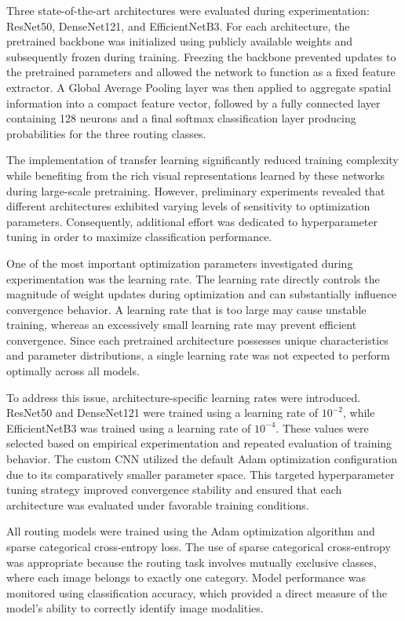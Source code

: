 Three state-of-the-art architectures were evaluated during experimentation: ResNet50, DenseNet121, and EfficientNetB3. For each architecture, the pretrained backbone was initialized using publicly available weights and subsequently frozen during training. Freezing the backbone prevented updates to the pretrained parameters and allowed the network to function as a fixed feature extractor. A Global Average Pooling layer was then applied to aggregate spatial information into a compact feature vector, followed by a fully connected layer containing 128 neurons and a final softmax classification layer producing probabilities for the three routing classes.

The implementation of transfer learning significantly reduced training complexity while benefiting from the rich visual representations learned by these networks during large-scale pretraining. However, preliminary experiments revealed that different architectures exhibited varying levels of sensitivity to optimization parameters. Consequently, additional effort was dedicated to hyperparameter tuning in order to maximize classification performance.

One of the most important optimization parameters investigated during experimentation was the learning rate. The learning rate directly controls the magnitude of weight updates during optimization and can substantially influence convergence behavior. A learning rate that is too large may cause unstable training, whereas an excessively small learning rate may prevent efficient convergence. Since each pretrained architecture possesses unique characteristics and parameter distributions, a single learning rate was not expected to perform optimally across all models.

To address this issue, architecture-specific learning rates were introduced. ResNet50 and DenseNet121 were trained using a learning rate of $10^{-2}$, while EfficientNetB3 was trained using a learning rate of $10^{-4}$. These values were selected based on empirical experimentation and repeated evaluation of training behavior. The custom CNN utilized the default Adam optimization configuration due to its comparatively smaller parameter space. This targeted hyperparameter tuning strategy improved convergence stability and ensured that each architecture was evaluated under favorable training conditions.

All routing models were trained using the Adam optimization algorithm and sparse categorical cross-entropy loss. The use of sparse categorical cross-entropy was appropriate because the routing task involves mutually exclusive classes, where each image belongs to exactly one category. Model performance was monitored using classification accuracy, which provided a direct measure of the model's ability to correctly identify image modalities.

